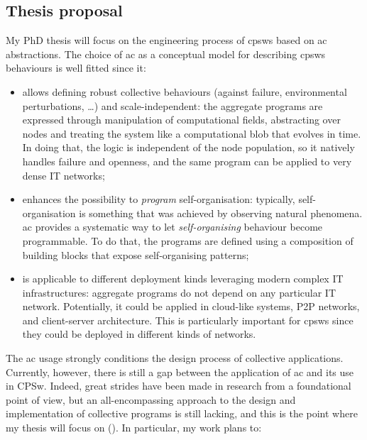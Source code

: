 \documentclass[11pt]{article}
\begin{document}
\subsection{Thesis proposal}
My PhD thesis will focus on the engineering process of \acp{cpsw} based on \ac{ac} abstractions. 
%
The choice of \ac{ac} as a conceptual model for describing \acp{cpsw} behaviours is well fitted since it:
\begin{itemize}
	\item allows defining robust collective behaviours (against failure, environmental perturbations, \dots{}) and scale-independent: 
	the aggregate programs are expressed through manipulation of computational fields, abstracting over nodes and treating the system like a computational blob that evolves in time. 
	In doing that, the logic is independent of the node population, so it natively handles failure and openness, and the same program can be applied to very dense IT networks;
	\item enhances the possibility to \textit{program} self-organisation: typically, self-organisation is something that was achieved by observing natural phenomena. 
	\ac{ac} provides a systematic way to let \textit{self-organising} behaviour become programmable.
	To do that, the programs are defined using a composition of building blocks that expose self-organising patterns;
	\item is applicable to different deployment kinds leveraging modern complex IT infrastructures: aggregate programs do not depend on any particular IT network. 
	Potentially, it could be applied in cloud-like systems, P2P networks, and client-server architecture. 
	This is particularly important for \acp{cpsw} since they could be deployed in different kinds of networks.
\end{itemize}
The \ac{ac} usage strongly conditions the design process of collective applications.
%
Currently, however, there is still a gap between the application of \ac{ac} and its use in CPSw. 
%
Indeed, great strides have been made in research from a foundational point of view, but an all-encompassing approach to the design and implementation of collective programs is still lacking, and this is the point where my thesis will focus on ().
%
In particular, my work plans to:
\end{document}
